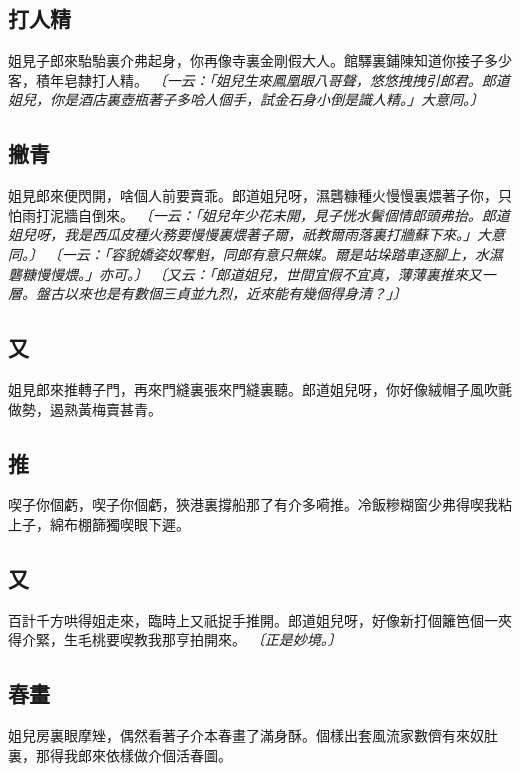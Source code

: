 \subsection*{打人精}

姐見子郎來駘駘裏介弗起身，你再像寺裏金剛假大人。館驛裏鋪陳知道你接子多少客，積年皂隸打人精。
\textit{〔一云：「姐兒生來鳳凰眼八哥聲，悠悠拽拽引郎君。郎道姐兒，你是酒店裏壺瓶著子多哈人個手，試金石身小倒是識人精。」大意同。〕}

\subsection*{撇青}

姐見郎來便閃開，啥個人前要賣乖。郎道姐兒呀，濕礱糠種火慢慢裏煨著子你，只怕雨打泥牆自倒來。
\textit{〔一云：「姐兒年少花未開，見子恍水鬢個情郎頭弗抬。郎道姐兒呀，我是西瓜皮種火務要慢慢裏煨著子爾，祇教爾雨落裏打牆蘇下來。」大意同。〕}
\textit{〔一云：「容貌嬌姿奴奪魁，同郎有意只無媒。爾是站垛踏車逐腳上，水濕礱糠慢慢煨。」亦可。〕}
\textit{〔又云：「郎道姐兒，世間宜假不宜真，薄薄裏推來又一層。盤古以來也是有數個三貞並九烈，近來能有幾個得身清？」〕}

\subsection*{又}

姐見郎來推轉子門，再來門縫裏張來門縫裏聽。郎道姐兒呀，你好像絨帽子風吹氈做勢，遏熟黃梅賣甚青。

\subsection*{推}

喫子你個虧，喫子你個虧，狹港裏撐船那了有介多嗬推。冷飯糝糊窗少弗得喫我粘上子，綿布棚篩獨喫眼下遲。

\subsection*{又}

百計千方哄得姐走來，臨時上又祇捉手推開。郎道姐兒呀，好像新打個籬笆個一夾得介緊，生毛桃要喫教我那亨拍開來。
\textit{〔正是妙境。〕}

\subsection*{春畫}

姐兒房裏眼摩矬，偶然看著子介本春畫了滿身酥。個樣出套風流家數儕有來奴肚裏，那得我郎來依樣做介個活春圖。

